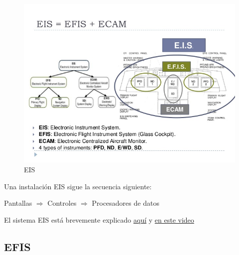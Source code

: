   \begin{figure}[!htb]
    \centering
    \includegraphics[width=\textwidth]{01.tablero.instrumentos/U01.imagenes/1.4.pantalla.electronica/01_eis.jpg}
    \caption{EIS}
    \label{fig:01.eis}
  \end{figure}







Una instalaci\'on \ac{EIS} sigue la secuencia siguiente:

\vspace{3mm}


 Pantallas \qquad $\Longrightarrow$ \qquad
 Controles  \qquad $\Longrightarrow$ \qquad
 Procesadores de datos 

 \begin{tcolorbox}
   El sistema EIS est\'a brevemente explicado  
   \href{https://www.youtube.com/watch?v=AS91uq1tkjQ}{aqu\'i} y \href{https://www.youtube.com/watch?v=2aix7kIL29o}{en este video}
 \end{tcolorbox}


\subsection{EFIS}
\label{sec:01.efis}


